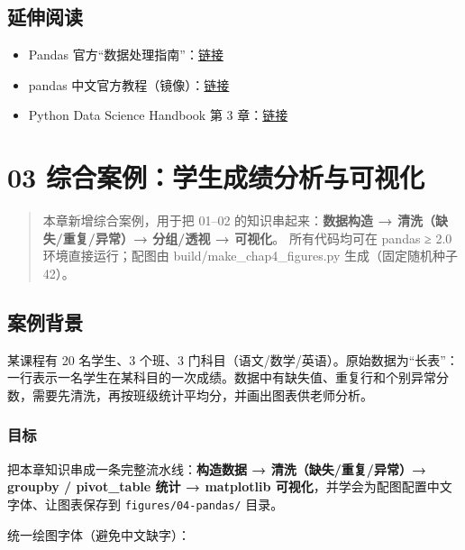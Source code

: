 \subsection{延伸阅读}\label{ux5ef6ux4f38ux9605ux8bfb-18}

\begin{itemize}
\tightlist
\item
  Pandas
  官方``数据处理指南''：\href{https://pandas.pydata.org/docs/getting_started/index.html}{链接}
\item
  pandas
  中文官方教程（镜像）：\href{https://pandas.pydata.org/docs/}{链接}
\item
  Python Data Science Handbook 第 3
  章：\href{https://github.com/jakevdp/PythonDataScienceHandbook}{链接}
\end{itemize}

\section{03
综合案例：学生成绩分析与可视化}\label{ux7efcux5408ux6848ux4f8bux5b66ux751fux6210ux7ee9ux5206ux6790ux4e0eux53efux89c6ux5316}

\begin{quote}
本章新增综合案例，用于把 01--02 的知识串起来：\textbf{数据构造 →
清洗（缺失/重复/异常）→ 分组/透视 → 可视化}。 所有代码均可在 pandas ≥
2.0 环境直接运行；配图由 build/make\_chap4\_figures.py
生成（固定随机种子 42）。
\end{quote}

\subsection{案例背景}\label{ux6848ux4f8bux80ccux666f-1}

某课程有 20 名学生、3 个班、3
门科目（语文/数学/英语）。原始数据为``长表''：一行表示一名学生在某科目的一次成绩。数据中有缺失值、重复行和个别异常分数，需要先清洗，再按班级统计平均分，并画出图表供老师分析。

\subsubsection{目标}\label{ux76eeux6807-20}

把本章知识串成一条完整流水线：\textbf{构造数据 → 清洗（缺失/重复/异常）→
groupby / pivot\_table 统计 → matplotlib
可视化}，并学会为配图配置中文字体、让图表保存到
\texttt{figures/04-pandas/} 目录。

统一绘图字体（避免中文缺字）：


